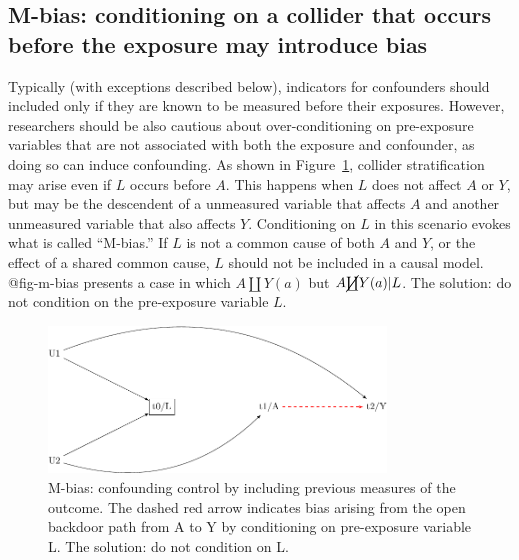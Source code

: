 \documentclass[
  singlecolumn]{report}
\begin{document}
\hypertarget{m-bias-conditioning-on-a-collider-that-occurs-before-the-exposure-may-introduce-bias}{%
\subsection{M-bias: conditioning on a collider that occurs before the
exposure may introduce
bias}\label{m-bias-conditioning-on-a-collider-that-occurs-before-the-exposure-may-introduce-bias}}

Typically (with exceptions described below), indicators for confounders
should included only if they are known to be measured before their
exposures. However, researchers should be also cautious about
over-conditioning on pre-exposure variables that are not associated with
both the exposure and confounder, as doing so can induce confounding. As
shown in Figure~\ref{fig-m-bias}, collider stratification may arise even
if \(L\) occurs before \(A\). This happens when \(L\) does not affect
\(A\) or \(Y\), but may be the descendent of a unmeasured variable that
affects \(A\) and another unmeasured variable that also affects \(Y\).
Conditioning on \(L\) in this scenario evokes what is called ``M-bias.''
If \(L\) is not a common cause of both \(A\) and \(Y\), or the effect of
a shared common cause, \(L\) should not be included in a causal model.
@fig-m-bias presents a case in which \(A \coprod Y(a)\) but
\(A \cancel{\coprod} Y(a)| L\). The solution: do not condition on the
pre-exposure variable \(L\).

\begin{figure}

{\centering \includegraphics[width=0.8\textwidth,height=\textheight]{causal-dags_files/figure-pdf/fig-m-bias-1.pdf}

}

\caption{\label{fig-m-bias}M-bias: confounding control by including
previous measures of the outcome. The dashed red arrow indicates bias
arising from the open backdoor path from A to Y by conditioning on
pre-exposure variable L. The solution: do not condition on L.}

\end{figure}
\end{document}

